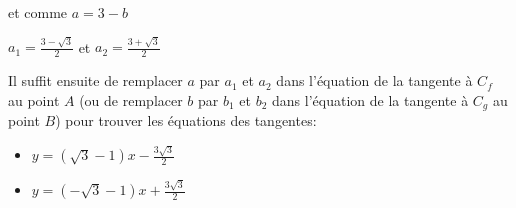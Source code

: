 \begin{corrige}
          et comme $a=3-b$
          \par
          $a_{1}=\frac{3-\sqrt{3}}{2}$ et $a_{2}=\frac{3+\sqrt{3}}{2}$
          \par
          Il suffit ensuite de remplacer $a$ par $a_{1}$ et $a_{2}$ dans l'équation de la tangente à $C_{f}$ au point $A$ (ou de remplacer $b$ par $b_{1}$ et $b_{2}$ dans l'équation de la tangente à $C_{g}$ au point $B$) pour trouver les équations des tangentes:
          \begin{itemize}
               \item
               $y=\left(\sqrt{3}-1\right)x-\frac{3\sqrt{3}}{2}$
               \item
               $y=\left(-\sqrt{3}-1\right)x+\frac{3\sqrt{3}}{2}$
          \end{itemize}

\begin{center}
\end{center}
     \end{corrige}
